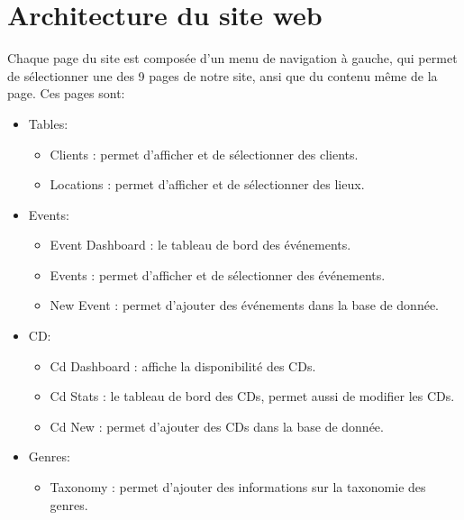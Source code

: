 \section{Architecture du site web}

Chaque page du site est composée d'un menu de navigation à gauche, qui permet de sélectionner une des 9 pages de notre site,
ansi que du contenu même de la page.
Ces pages sont:
\begin{itemize}
\item Tables:
    \begin{itemize}
    \item Clients : permet d'afficher et de sélectionner des clients.
    \item Locations : permet d'afficher et de sélectionner des lieux.
    \end{itemize}
\item Events:
    \begin{itemize}
    \item Event Dashboard : le tableau de bord des événements.
    \item Events : permet d'afficher et de sélectionner des événements.
    \item New Event : permet d'ajouter des événements dans la base de donnée.
    \end{itemize}
\item CD:
    \begin{itemize}
    \item Cd Dashboard : affiche la disponibilité des CDs.
    \item Cd Stats : le tableau de bord des CDs, permet aussi de modifier les CDs.
    \item Cd New : permet d'ajouter des CDs dans la base de donnée.
    \end{itemize}
\item Genres:
    \begin{itemize}
    \item Taxonomy : permet d'ajouter des informations sur la taxonomie des genres.
    \end{itemize}
\end{itemize}


